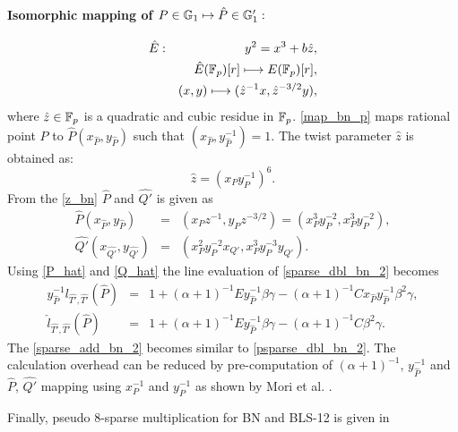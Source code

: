 \paragraph*{Isomorphic mapping of $P \in  {\mathbb{G}}_{1} \mapsto \hat{P} \in {\mathbb{G}}_{1}':$}
\begin{eqnarray}
	\hat{E}&:&y^2=x^3+b\hat{z},\nonumber\\
	&&\hat{E}(\mathbb{F}_p)[r]\longmapsto E(\mathbb{F}_p)[r],\nonumber\\
	&&(x,y)\longmapsto (\hat{z}^{-1}x,\hat{z}^{-3/2}y),\label{map_bn_p}
\end{eqnarray}
where $\hat{z} \in {\mathbb{F}}_{p}$ is a quadratic and cubic residue in ${\mathbb{F}}_{p}$.
\eqref{map_bn_p} maps rational point $P$ to $\hat{P}(x_{\hat{P}},y_{\hat{P}})$ such that $(x_{\hat{P}},y_{\hat{P}}^{-1})=1$.
The twist parameter $\hat{z}$ is obtained as:
\begin{equation}\label{z_bn}
	\hat{z}=(x_Py_P^{-1})^6.
\end{equation}
From the \eqref{z_bn} $\hat{P}$ and $\hat{Q'}$ is given as
\begin{subequations}
	\begin{eqnarray}
		\hat{P}(x_{\hat{P}}, y_{\hat{P}})&=& (x_P z^{-1},y_P z^{-3/2}) =(x_P^3y_P^{-2},x_P^3y_P^{-2}), \label{P_hat} \\ 
		\hat{Q'}(x_{\hat{Q'}}, y_{\hat{Q'}})&=&(x_P^2y_P^{-2}x_{Q'},x_P^3y_P^{-3}y_{Q'}). \label{Q_hat}
	\end{eqnarray}
\end{subequations}
Using \eqref{P_hat} and \eqref{Q_hat} the line evaluation of \eqref{sparse_dbl_bn_2} becomes 
\begin{subequations}
	\begin{eqnarray}
		y_{\hat{P}}^{-1}l_{\hat{T'},\hat{T'}}(\hat{P})&=& 1+(\alpha+1)^{-1}Ey_{\hat{P}}^{-1}\beta\gamma-(\alpha+1)^{-1}Cx_{\hat{P}}y_{\hat{P}}^{-1}\beta^2 \gamma, \nonumber \\
		\hat{l}_{\hat{T'},\hat{T'}}(\hat{P})&=& 1+(\alpha+1)^{-1}Ey_{\hat{P}}^{-1}\beta\gamma-(\alpha+1)^{-1}C\beta^2 \gamma. 
		\label{psparse_dbl_bn_2} 
	\end{eqnarray}
\end{subequations}
The \eqref{sparse_add_bn_2} becomes similar to \eqref{psparse_dbl_bn_2}. The calculation overhead can be reduced by pre-computation of $(\alpha+1)^{-1}$, $y_{\hat{P}}^{-1}$ and $\hat{P}$, $\hat{Q'}$ mapping using $x_{P}^{-1}$ and $y_{P}^{-1}$ as shown by Mori et al. \cite{PAIRING:MANS13}. 

Finally, pseudo 8-sparse multiplication for BN and BLS-12 is given in 


